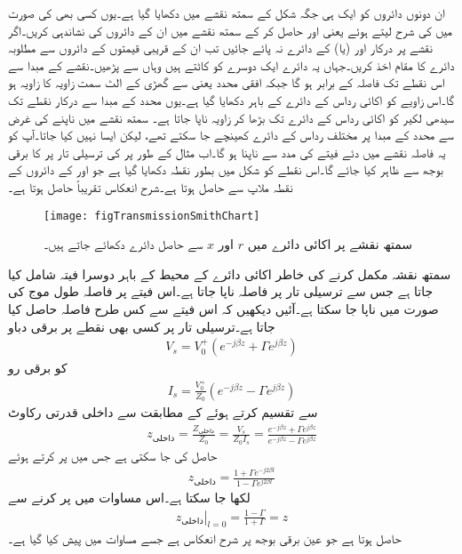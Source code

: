 ان دونوں دائروں کو ایک ہی جگہ شکل  کے سمتھ نقشے میں دکھایا گیا ہے۔یوں کسی بھی  کی صورت میں  کی شرح لیتے ہوئے  یعنی  اور  حاصل کر کے  سمتھ نقشے میں ان کے دائروں کی نشاندہی کریں۔اگر نقشے پر درکار  اور (یا)  کے دائرے نہ پائے جائیں تب ان کے قریبی قیمتوں کے دائروں سے مطلوبہ دائرے کا مقام اخذ کریں۔جہاں یہ دائرے  ایک دوسرے کو کاٹتے ہیں وہاں سے   پڑھیں۔نقشے  کے مبدا  سے  اس نقطے تک فاصلہ  کے برابر ہو گا جبکہ افقی محدد یعنی  سے گھڑی کے الٹ سمت زاویہ  کا زاویہ ہو گا۔اس زاویے کو اکائی رداس کے دائرے کے باہر دکھایا گیا ہے۔یوں محدد کے مبدا سے درکار نقطے تک سیدھی لکیر کو اکائی رداس کے دائرے تک بڑھا کر زاویہ ناپا جاتا ہے۔ سمتھ نقشے میں  ناپنے کی غرض سے محدد کے مبدا  پر مختلف رداس کے دائرے کھینچے جا سکتے تھے، لیکن ایسا نہیں کیا جاتا۔آپ کو یہ فاصلہ نقشے میں دئے فیتے کی مدد سے ناپنا ہو گا۔اب مثال کے طور پر  کی ترسیلی تار پر  کا برقی بوجھ  سے ظاہر کیا جائے گا۔اس نقطے کو شکل میں بطور نقطہ  دکھایا گیا ہے جو  اور  کے دائروں کے نقطہ ملاپ سے حاصل ہوتا ہے۔شرح انعکاس تقریباً   حاصل ہوتا ہے۔
\begin{figure}
\centering
\texttt{[image: figTransmissionSmithChart]}
\caption{سمتھ نقشے پر اکائی دائرے میں $r$ اور $x$ سے حاصل دائرے دکھائے جاتے ہیں۔}
\label{شکل_ترسیلی_سمتھ-نقشہ_پ}
\end{figure}

سمتھ نقشہ مکمل کرنے کی خاطر اکائی دائرے کے  محیط کے باہر دوسرا فیتہ شامل کیا جاتا ہے جس سے ترسیلی تار پر فاصلہ ناپا جاتا ہے۔اس فیتے پر فاصلہ طول موج  کی صورت میں ناپا جا سکتا ہے۔آئیں دیکھیں کہ اس فیتے سے کس طرح فاصلہ حاصل کیا جاتا ہے۔ترسیلی تار پر کسی بھی نقطے پر برقی دباو
\begin{align*}
V_s=V_0^+ \left(e^{-j\beta z}+\Gamma e^{j \beta z} \right)
\end{align*}
کو برقی رو
\begin{align*}
I_s =\frac{V_0^+}{Z_0}\left(e^{-j\beta z}-\Gamma e^{j \beta z} \right)
\end{align*}
سے تقسیم کرتے ہوئے  کے مطابقت سے داخلی قدرتی رکاوٹ
\begin{align*}
z_{\text{داخلی}} = \frac{Z_{\text{داخلی}}}{Z_0}=\frac{V_s}{Z_0 I_s}=\frac{e^{-j\beta z}+\Gamma e^{j \beta z} }{e^{-j\beta z}-\Gamma e^{j \beta z} }
\end{align*}
حاصل کی جا سکتی ہے جس میں  پر کرتے ہوئے
\begin{align}\label{مساوات_ترسیلی_داخلی_رکاوٹ_سمتھ_الف}
z_{\text{داخلی}} =\frac{1+\Gamma e^{-j 2\beta l}}{1-\Gamma e^{j 2\beta l}}
\end{align}
لکھا جا سکتا ہے۔اس مساوات میں  پر کرنے سے
\begin{align}\label{مساوات_ترسیلی_داخلی_رکاوٹ_سمتھ_ب}
\left. z_{\text{داخلی}} \right|_{l=0}=\frac{1-\Gamma}{1+\Gamma} = z
\end{align}
حاصل ہوتا ہے جو عین برقی بوجھ پر شرح انعکاس ہے جسے مساوات  میں پیش کیا گیا ہے۔

